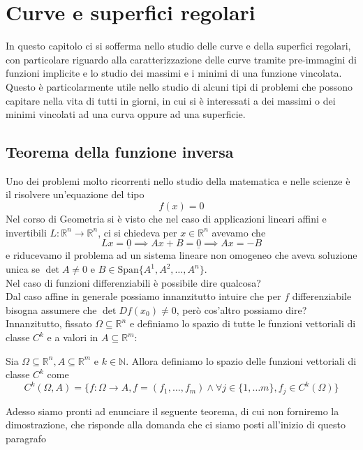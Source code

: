 \chapter{Curve e superfici regolari}
In questo capitolo ci si sofferma nello studio delle curve e della superfici regolari, con particolare riguardo alla caratterizzazione delle curve tramite pre-immagini di funzioni implicite e lo studio dei massimi e i minimi di una funzione vincolata. Questo è particolarmente utile nello studio di alcuni tipi di problemi che possono capitare nella vita di tutti in giorni, in cui si è interessati a dei massimi o dei minimi vincolati ad una curva oppure ad una superficie.

\section{Teorema della funzione inversa}
Uno dei problemi molto ricorrenti nello studio della matematica e nelle scienze è il risolvere un'equazione del tipo
$$
f(x) = 0
$$
Nel corso di Geometria si è visto che nel caso di applicazioni lineari affini e invertibili $L: \mathbb{R}^n \to \mathbb{R}^n$, ci si chiedeva per $x \in \mathbb{R}^n$ avevamo che
$$
Lx = \underline{0} \implies Ax + B = \underline{0} \implies Ax = -B
$$
e riducevamo il problema ad un sistema lineare non omogeneo che aveva soluzione unica se $\det{A} \neq 0$ e $B \in \text{Span}\{ A^1, A^2, \ldots, A^n \}$. \\
Nel caso di funzioni differenziabili è possibile dire qualcosa? \\
Dal caso affine in generale possiamo innanzitutto intuire che per $f$ differenziabile bisogna assumere che $\det{Df(x_0)} \neq 0$, però cos'altro possiamo dire? \\
Innanzitutto, fissato $\Omega \subseteq \mathbb{R}^n$ e definiamo lo spazio di tutte le funzioni vettoriali di classe $C^k$ e a valori in $A \subseteq \mathbb{R}^m$:
\begin{definition}
Sia $\Omega \subseteq \mathbb{R}^n, A \subseteq \mathbb{R}^m$ e $k \in \mathbb{N}$. Allora definiamo lo spazio delle funzioni vettoriali di classe $C^k$ come
$$
C^k(\Omega,A) = \{f: \Omega \to A, f = (f_1, \ldots, f_m) \wedge \forall j \in \{1, \ldots m \}, f_j \in C^k(\Omega) \}
$$
\end{definition}
Adesso siamo pronti ad enunciare il seguente teorema, di cui non forniremo la dimostrazione, che risponde alla domanda che ci siamo posti all'inizio di questo paragrafo
